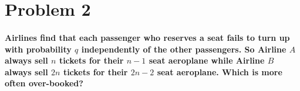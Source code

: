\documentclass[12pt,letterpaper]{article}
\begin{document}

    \section*{Problem 2}

    \paragraph*{Airlines find that each passenger who reserves a seat fails to turn up with probability $q$ independently of the other passengers. So Airline $A$ always sell $n$ tickets for their $n-1$ seat aeroplane while Airline $B$ always sell $2n$ tickets for their $2n-2$ seat aeroplane. Which is more often over-booked?}
\end{document}
